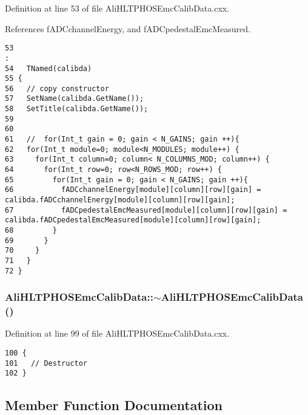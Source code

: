 Definition at line 53 of file Ali\-HLTPHOSEmc\-Calib\-Data.cxx.

References f\-ADCchannel\-Energy, and f\-ADCpedestal\-Emc\-Measured.

\footnotesize\begin{verbatim}53                                                                                     :
54   TNamed(calibda)
55 {
56   // copy constructor
57   SetName(calibda.GetName());
58   SetTitle(calibda.GetName());
59 
60 
61   //  for(Int_t gain = 0; gain < N_GAINS; gain ++){
62   for(Int_t module=0; module<N_MODULES; module++) {
63     for(Int_t column=0; column< N_COLUMNS_MOD; column++) {
64       for(Int_t row=0; row<N_ROWS_MOD; row++) {
65         for(Int_t gain = 0; gain < N_GAINS; gain ++){
66           fADCchannelEnergy[module][column][row][gain] =  calibda.fADCchannelEnergy[module][column][row][gain];
67           fADCpedestalEmcMeasured[module][column][row][gain] = calibda.fADCpedestalEmcMeasured[module][column][row][gain];
68         }
69       }  
70     }
71   }
72 }
\end{verbatim}\normalsize 


\subsubsection{\setlength{\rightskip}{0pt plus 5cm}Ali\-HLTPHOSEmc\-Calib\-Data::$\sim${\bf Ali\-HLTPHOSEmc\-Calib\-Data} ()\hspace{0.3cm}{\tt  [virtual]}}\label{classAliHLTPHOSEmcCalibData_a4}




Definition at line 99 of file Ali\-HLTPHOSEmc\-Calib\-Data.cxx.

\footnotesize\begin{verbatim}100 {
101   // Destructor
102 }
\end{verbatim}\normalsize 




\subsection{Member Function Documentation}

